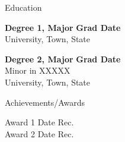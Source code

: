 \documentclass{resume} %
\begin{document}

\begin{rSection}{Education}

{\bf{} Degree 1, Major} \hfill{} {\textbf{Grad Date}} \\ 
University, Town, State

{\bf{} Degree 2, Major} \hfill{} {\textbf{Grad Date}}\\
Minor in XXXXX\\
University, Town, State

\end{rSection}


\begin{rSection}{Achievements/Awards}

    Award 1 \hfill{} Date Rec.\\
    Award 2 \hfill{} Date Rec.

\end{rSection}

\end{document}
